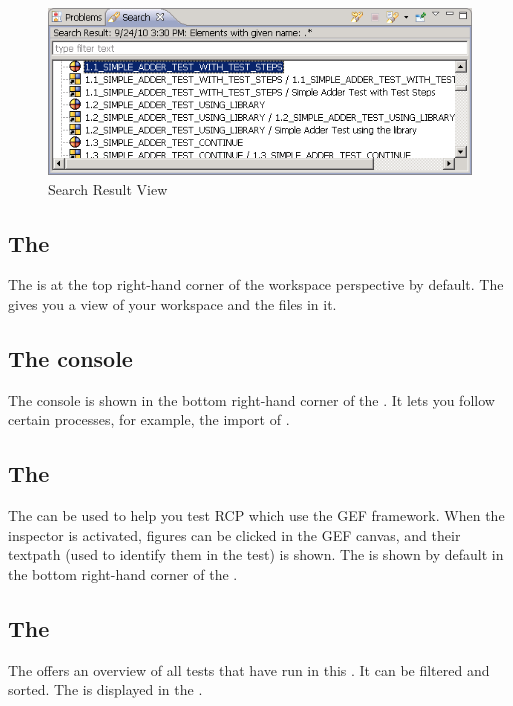 \begin{figure}[hbtp]
\begin{center}
\includegraphics{Userinterface/Editors/PS/showresultview}
\caption{Search Result View}
\label{showresultview}
\end{center}
\end{figure}

\subsection{The \gdnavview{}}
\protect{}
The \gdnavview{} is at the top right-hand corner of the workspace perspective by default. The \gdnavview{} gives you a view of your workspace and the files in it. 


\subsection{The console}
The console is shown in the bottom right-hand corner of the \specpersp{}. It lets you follow certain processes, for example, the import of \gdprojects{}.  

\subsection{The \gdinspector{}}
The \gdinspector{} can be used to help you test RCP \gdauts{} which use the GEF framework. When the inspector is activated, figures can be clicked in the GEF canvas, and their textpath (used to identify them in the test) is shown. The \gdinspector{} is shown by default in the bottom right-hand corner of the \specpersp{}. 

\subsection{The \gdtestsummaryview{}}
The \gdtestsummaryview{} offers an overview of all tests that have run in this \gddb{}. It can be filtered and sorted.  The \gdtestsummaryview{} is displayed in the \reportpersp{}. 

